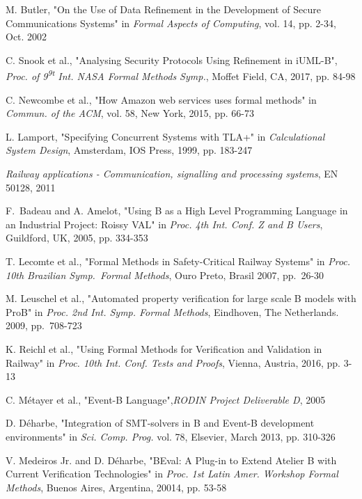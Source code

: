 \documentclass[12pt,journal,duplex]{IEEEtran}
\begin{document}
\begin{thebibliography}{2}
		M. Butler, "On the Use of Data Refinement in the Development of Secure Communications Systems" in \emph{Formal Aspects of Computing}, vol. 14, pp. 2-34, Oct. 2002

		C. Snook et al., "Analysing Security Protocols Using Refinement in iUML-B", \emph{Proc. of 9\textsuperscript{9t} Int. NASA Formal Methods Symp.}, Moffet Field, CA, 2017, pp. 84-98

		C. Newcombe et al., "How Amazon web services uses formal methods" in \emph{Commun. of the ACM}, vol. 58, New York, 2015, pp. 66-73

		L. Lamport, "Specifying Concurrent Systems with TLA+" in \emph{Calculational System Design}, Amsterdam, IOS Press, 1999, pp. 183-247

		\emph{Railway applications - Communication, signalling and processing systems}, EN 50128, 2011

		F.~Badeau and A. Amelot, "Using B as a High Level Programming Language in an Industrial Project: Roissy VAL" in \emph{Proc. 4th Int. Conf. Z and B Users}, Guildford, UK, 2005, pp. 334-353

		T. Lecomte et al., "Formal Methods in Safety-Critical Railway Systems" in \emph{Proc. 10th Brazilian Symp.~Formal Methods}, Ouro Preto, Brasil 2007, pp.~26-30

		M. Leuschel et al., "Automated property verification for large scale B models with ProB" in \emph{Proc. 2nd Int. Symp. Formal Methods}, Eindhoven, The Netherlands. 2009, pp.~708-723

		K. Reichl et al., "Using Formal Methods for Verification and Validation in Railway" in \emph{Proc. 10th Int. Conf. Tests and Proofs}, Vienna, Austria, 2016, pp. 3-13

		C. M\'{e}tayer et al., "Event-B Language",\emph{RODIN Project Deliverable D}, 2005

		D. D\'{e}harbe, "Integration of SMT-solvers in B and Event-B development environments" in \emph{Sci. Comp. Prog.} vol. 78, Elsevier, March 2013, pp. 310-326

		V. Medeiros Jr. and D. D\'{e}harbe, "BEval: A Plug-in to Extend Atelier B with Current Verification Technologies" in \emph{Proc. 1st Latin Amer. Workshop Formal Methods}, Buenos Aires, Argentina, 20014, pp. 53-58


\end{thebibliography}
\end{document}
